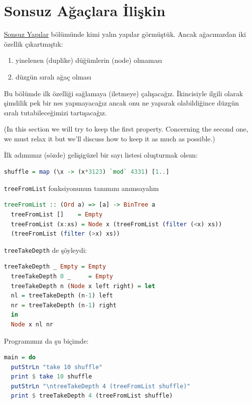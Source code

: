 \documentclass[a4paper,14pt,openany]{extbook} %
\providecommand{\tightlist}{%
  \setlength{\itemsep}{0pt}\setlength{\parskip}{0pt}}
\let\emph\textit
\begin{document}
\section{Sonsuz Ağaçlara İlişkin}\label{sonsuz-aux11fauxe7lar-hakkux131nda}

\hyperref[33-sonsuz-yapux131lar]{Sonsuz Yapılar} bölümünde kimi yalın
yapılar görmüştük. Ancak ağacımızdan iki özellik çıkartmıştık:

\begin{enumerate}
\def\labelenumi{\arabic{enumi}.}\tightlist
\item yinelenen (duplike) düğümlerin (node) olmaması
\item düzgün sıralı ağaç olması
\end{enumerate}

Bu bölümde ilk özelliği sağlamaya (iletmeye) çalışacağız. İkincisiyle ilgili olarak
şimdilik pek bir nes yapmayacağız ancak onu ne yaparak olabildiğince düzgün sıralı
tutabileceğimizi tartışacağız.

{\emph\small(In this section we will try to keep the first property. Concerning
  the second one, we must relax it but we’ll discuss how to keep it as much as possible.)}

İlk adımımız (sözde) gelişigüzel bir sayı listesi oluşturmak olsun:

\begin{lstlisting}[language=Haskell]
  shuffle = map (\x -> (x*3123) `mod` 4331) [1..]
\end{lstlisting}

\lstinline!treeFromList! fonksiyonunun tanımını anımsayalım

\begin{lstlisting}[language=Haskell]
  treeFromList :: (Ord a) => [a] -> BinTree a
  treeFromList []    = Empty
  treeFromList (x:xs) = Node x (treeFromList (filter (<x) xs))
  (treeFromList (filter (>x) xs))
\end{lstlisting}

\lstinline!treeTakeDepth! de şöyleydi:

\begin{lstlisting}[language=Haskell]
  treeTakeDepth _ Empty = Empty
  treeTakeDepth 0 _     = Empty
  treeTakeDepth n (Node x left right) = let
  nl = treeTakeDepth (n-1) left
  nr = treeTakeDepth (n-1) right
  in
  Node x nl nr
\end{lstlisting}

Programımız da şu biçimde:

\begin{lstlisting}[language=Haskell]
  main = do
  putStrLn "take 10 shuffle"
  print $ take 10 shuffle
  putStrLn "\ntreeTakeDepth 4 (treeFromList shuffle)"
  print $ treeTakeDepth 4 (treeFromList shuffle)
\end{lstlisting}
\end{document}
